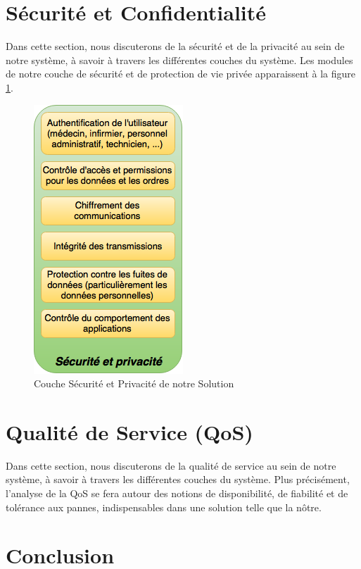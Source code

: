 \documentclass{article}
\begin{document}
\section{Sécurité et Confidentialité}
Dans cette section, nous discuterons de la sécurité et de la privacité au sein de notre système, à savoir à travers les différentes couches du système. Les modules de notre couche de sécurité et de protection de vie privée apparaissent à la figure \ref{securite}.
\newline
\begin{figure}[h!]
	\centering
	\includegraphics[width=0.5\textwidth]{securite.png}
	\caption{Couche Sécurité et Privacité de notre Solution}
	\label{securite}
\end{figure}



\section{Qualité de Service (QoS)}
Dans cette section, nous discuterons de la qualité de service au sein de notre système, à savoir à travers les différentes couches du système. Plus précisément, l'analyse de la QoS se fera autour des notions de disponibilité, de fiabilité et de tolérance aux pannes, indispensables dans une solution telle que la nôtre. %


\section{Conclusion}










\end{document}
